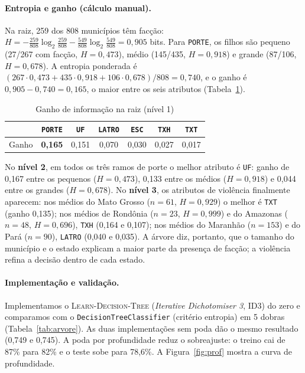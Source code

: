 \documentclass[article,12pt,oneside,a4paper,brazil,sumario=tradicional]{abntex2}
\newcommand{\fonteautores}{\fonte{Elaborada pelos autores (2026).}}
\begin{document}
\paragraph{Entropia e ganho (cálculo manual).} Na raiz, 259 dos 808 municípios têm facção:
$H=-\frac{259}{808}\log_2\frac{259}{808}-\frac{549}{808}\log_2\frac{549}{808}=0{,}905$
bits. Para \texttt{PORTE}, os filhos são pequeno (27/267 com facção, $H=0{,}473$), médio
(145/435, $H=0{,}918$) e grande (87/106, $H=0{,}678$). A entropia ponderada é
$(267\cdot0{,}473+435\cdot0{,}918+106\cdot0{,}678)/808=0{,}740$, e o ganho é
$0{,}905-0{,}740=0{,}165$, o maior entre os seis atributos (Tabela~\ref{tab:ganho}).

\begin{table}[htbp]
\centering\small
\caption{Ganho de informação na raiz (nível 1)}\label{tab:ganho}
\begin{tabular}{@{}lcccccc@{}}
\toprule
& \texttt{PORTE} & \texttt{UF} & \texttt{LATRO} & \texttt{ESC} & \texttt{TXH} & \texttt{TXT}\\
\midrule
Ganho & \textbf{0,165} & 0,151 & 0,070 & 0,030 & 0,027 & 0,017\\
\bottomrule
\end{tabular}
\fonteautores
\end{table}

No \textbf{nível 2}, em todos os três ramos de porte o melhor atributo é \texttt{UF}: ganho
de 0,167 entre os pequenos ($H=0{,}473$), 0,133 entre os médios ($H=0{,}918$) e 0,044 entre
os grandes ($H=0{,}678$). No \textbf{nível 3}, os atributos de violência finalmente
aparecem: nos médios do Mato Grosso ($n=61$, $H=0{,}929$) o melhor é \texttt{TXT} (ganho
0,135); nos médios de Rondônia ($n=23$, $H=0{,}999$) e do Amazonas ($n=48$, $H=0{,}696$),
\texttt{TXH} (0,164 e 0,107); nos médios do Maranhão ($n=153$) e do Pará ($n=90$),
\texttt{LATRO} (0,040 e 0,035). A árvore diz, portanto, que o tamanho do município e o
estado explicam a maior parte da presença de facção; a violência refina a decisão dentro de
cada estado.

\paragraph{Implementação e validação.} Implementamos o \textsc{Learn-Decision-Tree}
(\emph{Iterative Dichotomiser 3}, ID3) \cite{r1} do zero e comparamos com o \texttt{DecisionTreeClassifier} (critério entropia) em
5 dobras (Tabela~\ref{tab:arvore}). As duas implementações sem poda dão o mesmo resultado
(0,749 e 0,745). A poda por profundidade reduz o sobreajuste: o treino cai de 87\% para
82\% e o teste sobe para 78,6\%. A Figura~\ref{fig:prof} mostra a curva de profundidade.
\end{document}
